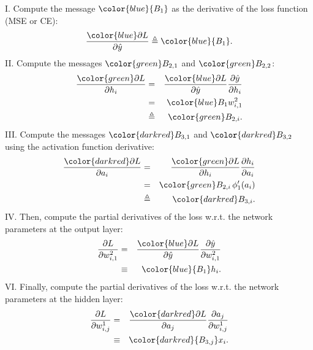 \documentclass[letterpaper,10pt,english]{jupyterBook}
\begin{document}
\sphinxAtStartPar
I. Compute the message \( {\color{blue} {B_1} } \) as the derivative of the loss function (MSE or CE):
\label{equation:neuralnets_backprop:539ac6cb-b0e4-4896-81d4-80975bee4b0f}\begin{equation}
 {\color{blue} \partial L \over \partial \hat{y}} \triangleq {\color{blue} {B_1} }.
\end{equation}
\sphinxAtStartPar
II. Compute the messages \( {\color{green} B_{2,1} } \) and \( {\color{green} B_{2,2} } \):
\label{equation:neuralnets_backprop:ac001a3e-7b52-424a-8058-561adfd25351}\begin{eqnarray}
 {\color{green} \partial L \over \partial h_i} &=& {\color{blue} \partial L \over \partial \hat{y}}{\partial \hat{y} \over \partial h_i}  \\
 &=& {\color{blue} B_1 } w^{2}_{i,1}  \\
 &\triangleq& {\color{green} B_{2,i}}.
\end{eqnarray}
\sphinxAtStartPar
III. Compute the messages \({\color{darkred} B_{3,1} } \) and \({\color{darkred} B_{3,2} }\) using the activation function derivative:
\label{equation:neuralnets_backprop:b7f10211-ba08-46fe-b5b5-c4f6a30c4acf}\begin{eqnarray}
 {\color{darkred} \partial L \over \partial a_i} &=& {\color{green} \partial L \over \partial h_i}{\partial h_i \over \partial a_i}  \\
 &=& {\color{green} B_{2,i} } \, \phi_1'(a_i)  \\
 &\triangleq& {\color{darkred} B_{3,i} }.
\end{eqnarray}
\sphinxAtStartPar
IV. Then, compute the partial derivatives of the loss w.r.t. the network parameters at the output layer:
\label{equation:neuralnets_backprop:3c4905ee-035f-4219-82ea-31808061b828}\begin{eqnarray}
 {\partial L \over \partial w^2_{i,1}} &=& {\color{blue} \partial L \over \partial \hat{y}}{\partial \hat{y} \over \partial w^2_{i,1}}   \\
&\equiv& {\color{blue} {B_1} } {h_i}.
\end{eqnarray}
\sphinxAtStartPar
VI. Finally, compute the partial derivatives of the loss w.r.t. the network parameters at the hidden layer:
\label{equation:neuralnets_backprop:6a10c288-4cb2-4cc2-9eaf-25b5cc6de78d}\begin{eqnarray}
{\partial L \over \partial w^1_{i,j}} &=& {\color{darkred} \partial L \over \partial a_j}{\partial a_j \over \partial w^1_{i,j}}  \\
&\equiv& {\color{darkred} {B_{3,j}} } {x_i}.
\end{eqnarray}\label{neuralnets_backprop:definition-3}
\end{document}
